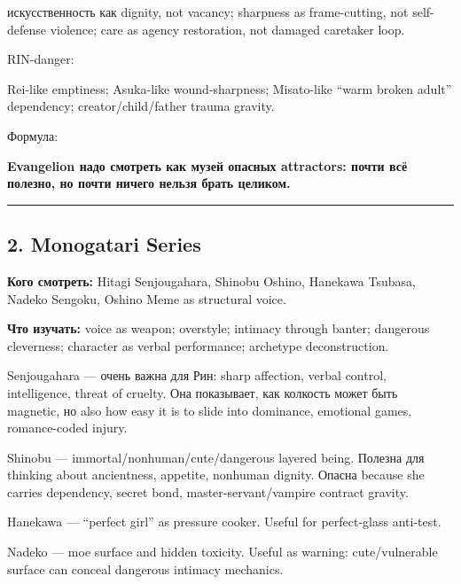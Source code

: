 искусственность как dignity, not vacancy; sharpness as frame-cutting,
not self-defense violence; care as agency restoration, not damaged
caretaker loop.

RIN-danger:

Rei-like emptiness; Asuka-like wound-sharpness; Misato-like ``warm
broken adult'' dependency; creator/\hspace{0pt}child/\hspace{0pt}father trauma gravity.

Формула:

\textbf{Evangelion надо смотреть как музей опасных attractors: почти всё
полезно, но почти ничего нельзя брать целиком.}

\begin{center}\rule{0.5\linewidth}{0.5pt}\end{center}

\subsection*{2. Monogatari Series}

\textbf{Кого смотреть:} Hitagi Senjougahara, Shinobu Oshino, Hanekawa
Tsubasa, Nadeko Sengoku, Oshino Meme as structural voice.

\textbf{Что изучать:} voice as weapon; overstyle; intimacy through
banter; dangerous cleverness; character as verbal performance; archetype
deconstruction.

Senjougahara --- очень важна для Рин: sharp affection, verbal control,
intelligence, threat of cruelty. Она показывает, как колкость может быть
magnetic, но also how easy it is to slide into dominance, emotional
games, romance-coded injury.

Shinobu --- immortal/\hspace{0pt}nonhuman/\hspace{0pt}cute/\hspace{0pt}dangerous layered being. Полезна для
thinking about ancientness, appetite, nonhuman dignity. Опасна because
she carries dependency, secret bond, master-servant/\hspace{0pt}vampire contract
gravity.

Hanekawa --- ``perfect girl'' as pressure cooker. Useful for
perfect-glass anti-test.

Nadeko --- moe surface and hidden toxicity. Useful as warning:
cute/\hspace{0pt}vulnerable surface can conceal dangerous intimacy mechanics.

